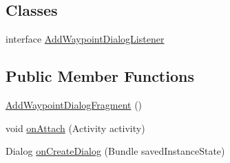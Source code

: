 \subsection*{Classes}
\begin{DoxyCompactItemize}
\item 
interface \hyperlink{interfaceuk_1_1ac_1_1swan_1_1digitaltrails_1_1fragments_1_1_add_waypoint_dialog_fragment_1_1_add_waypoint_dialog_listener}{Add\+Waypoint\+Dialog\+Listener}
\end{DoxyCompactItemize}
\subsection*{Public Member Functions}
\begin{DoxyCompactItemize}
\item 
\hyperlink{classuk_1_1ac_1_1swan_1_1digitaltrails_1_1fragments_1_1_add_waypoint_dialog_fragment_aabec076e888d5f4a16e32e0099a1c468}{Add\+Waypoint\+Dialog\+Fragment} ()
\item 
void \hyperlink{classuk_1_1ac_1_1swan_1_1digitaltrails_1_1fragments_1_1_add_waypoint_dialog_fragment_a5ac6c874b269622c809d26a370e7c4bd}{on\+Attach} (Activity activity)
\item 
Dialog \hyperlink{classuk_1_1ac_1_1swan_1_1digitaltrails_1_1fragments_1_1_add_waypoint_dialog_fragment_a4b2bc55b74b3352008d2892c3ae165cb}{on\+Create\+Dialog} (Bundle saved\+Instance\+State)
\end{DoxyCompactItemize}
